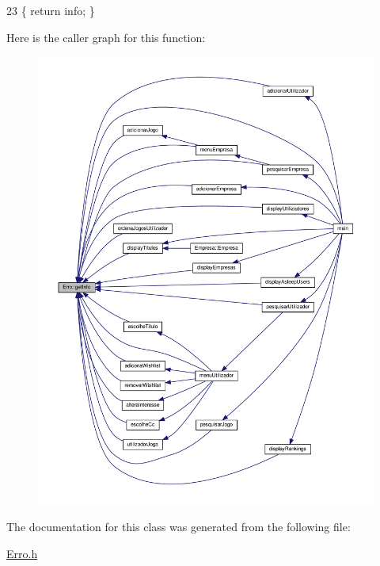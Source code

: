 \begin{DoxyCode}
23 \{ \textcolor{keywordflow}{return} info; \}
\end{DoxyCode}
Here is the caller graph for this function\+:
\nopagebreak
\begin{figure}[H]
\begin{center}
\leavevmode
\includegraphics[width=350pt]{classErro_abfc1e9735b259d88bb97828a23164eb0_icgraph}
\end{center}
\end{figure}


The documentation for this class was generated from the following file\+:\begin{DoxyCompactItemize}
\item 
\hyperlink{Erro_8h}{Erro.\+h}\end{DoxyCompactItemize}
